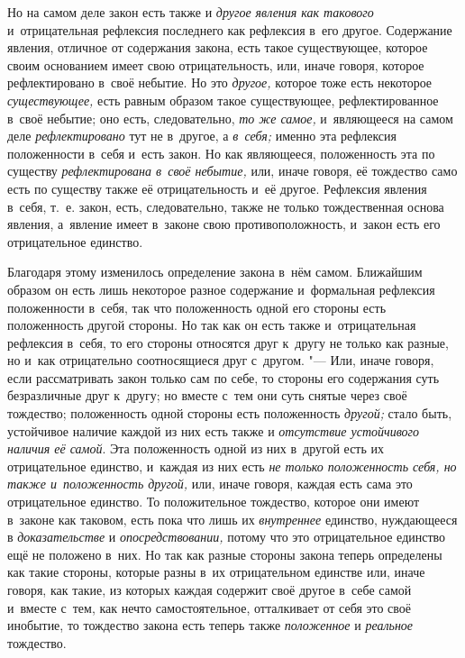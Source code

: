 Но на самом деле закон есть также и {\em другое явления
как такового} и~отрицательная рефлексия последнего как рефлексия в~его
другое. Содержание явления, отличное от содержания закона, есть такое
существующее, которое своим основанием имеет свою отрицательность, или,
иначе говоря, которое рефлектировано в~своё небытие. Но это
{\em другое,} которое тоже есть некоторое
{\em существующее,} есть равным образом такое
существующее, рефлектированное в~своё небытие; оно есть, следовательно,
{\em то же самое,} и~являющееся на самом деле
{\em рефлектировано} тут не в~другое, а
{\em в~себя;} именно эта рефлексия положенности в~себя
и~есть закон. Но как являющееся, положенность эта по существу
{\em рефлектирована в~своё небытие,} или, иначе говоря,
её тождество само есть по существу также её отрицательность и~её другое.
Рефлексия явления в~себя, т.~е. закон, есть, следовательно, также не только
тождественная основа явления, а~явление имеет в~законе свою
противоположность, и~закон есть его отрицательное единство.

Благодаря этому изменилось определение закона в~нём самом. Ближайшим образом
он есть лишь некоторое разное содержание и~формальная рефлексия
положенности в~себя, так что положенность одной его стороны есть
положенность другой стороны. Но так как он есть также и~отрицательная
рефлексия в~себя, то его стороны относятся друг к~другу не только как
разные, но и~как отрицательно соотносящиеся друг с~другом. "--- Или, иначе
говоря, если рассматривать закон только сам по себе, то стороны его
содержания суть безразличные друг к~другу; но вместе с~тем они суть снятые
через своё тождество; положенность одной стороны есть положенность
{\em другой;} стало быть, устойчивое наличие каждой из
них есть также и {\em отсутствие устойчивого наличия её
самой}. Эта положенность одной из них в~другой есть их отрицательное
единство, и~каждая из них есть {\em не только
положенность себя, но также и~положенность другой,} или, иначе говоря,
каждая есть сама это отрицательное единство. То положительное тождество,
которое они имеют в~законе как таковом, есть пока что лишь их
{\em внутреннее} единство, нуждающееся в
{\em доказательстве} и
{\em опосредствовании,} потому что это отрицательное
единство ещё не положено в~них. Но так как разные стороны закона теперь
определены как такие стороны, которые разны в~их отрицательном единстве
или, иначе говоря, как такие, из которых каждая содержит своё другое в~себе
самой и~вместе с~тем, как нечто самостоятельное, отталкивает от себя это
своё инобытие, то тождество закона есть теперь также
{\em положенное} и {\em реальное}
тождество.

